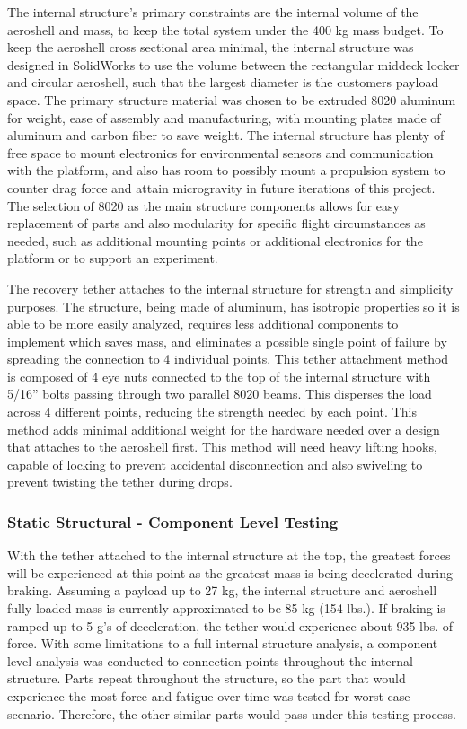 \indent\indent The internal structure's primary constraints are the internal volume of the aeroshell and mass, to keep the total system under the 400 kg mass budget. To keep the aeroshell cross sectional area minimal, the internal structure was designed in SolidWorks to use the volume between the rectangular middeck locker and circular aeroshell, such that the largest diameter is the customers payload space. The primary structure material was chosen to be extruded 8020 aluminum for weight, ease of assembly and manufacturing, with mounting plates made of aluminum and carbon fiber to save weight. The internal structure has plenty of free space to mount electronics for environmental sensors and communication with the platform, and also has room to possibly mount a propulsion system to counter drag force and attain microgravity in future iterations of this project. The selection of 8020 as the main structure components allows for easy replacement of parts and also modularity for specific flight circumstances as needed, such as additional mounting points or additional electronics for the platform or to support an experiment.

\indent\indent The recovery tether attaches to the internal structure for strength and simplicity purposes. The structure, being made of aluminum, has isotropic properties so it is able to be more easily analyzed, requires less additional components to implement which saves mass, and eliminates a possible single point of failure by spreading the connection to 4 individual points. This tether attachment method is composed of 4 eye nuts connected to the top of the internal structure with 5/16” bolts passing through two parallel 8020 beams. This disperses the load across 4 different points, reducing the strength needed by each point. This method adds minimal additional weight for the hardware needed over a design that attaches to the aeroshell first. This method will need heavy lifting hooks, capable of locking to prevent accidental disconnection and also swiveling to prevent twisting the tether during drops.

\subsubsection*{Static Structural - Component Level Testing}
\indent\indent With the tether attached to the internal structure at the top, the greatest forces will be experienced at this point as the greatest mass is being decelerated during braking. Assuming a payload up to 27 kg, the internal structure and aeroshell fully loaded mass is currently approximated to be 85 kg (154 lbs.). If braking is ramped up to 5 g’s of deceleration, the tether would experience about 935 lbs. of force. With some limitations to a full internal structure analysis, a component level analysis was conducted to connection points throughout the internal structure. Parts repeat throughout the structure, so the part that would experience the most force and fatigue over time was tested for worst case scenario. Therefore, the other similar parts would pass under this testing process.

